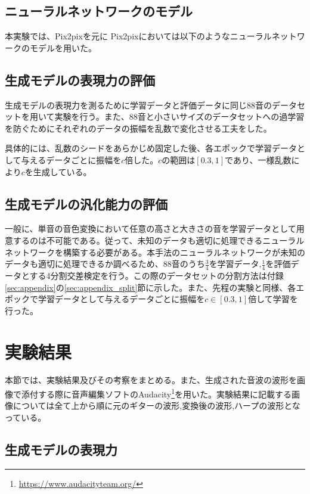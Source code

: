 \subsection{ニューラルネットワークのモデル}

本実験では、Pix2pixを元に
Pix2pixにおいては以下のようなニューラルネットワークのモデルを用いた。



\subsection{生成モデルの表現力の評価}

生成モデルの表現力を測るために学習データと評価データに同じ88音のデータセットを用いて実験を行う。また、88音と小さいサイズのデータセットへの過学習を防ぐためにそれぞれのデータの振幅を乱数で変化させる工夫をした。

具体的には、乱数のシードをあらかじめ固定した後、各エポックで学習データとして与えるデータごとに振幅を$c$倍した。$c$の範囲は$[0.3,1]$であり、一様乱数により$c$を生成している。

\subsection{生成モデルの汎化能力の評価}

一般に、単音の音色変換において任意の高さと大きさの音を学習データとして用意するのは不可能である。従って、未知のデータも適切に処理できるニューラルネットワークを構築する必要がある。本手法のニューラルネットワークが未知のデータも適切に処理できるか調べるため、88音のうち$\frac{3}{4}$を学習データ,$\frac{1}{4}$を評価データとする4分割交差検定を行う。この際のデータセットの分割方法は付録\ref{sec:appendix}の\ref{sec:appendix_split}節に示した。また、先程の実験と同様、各エポックで学習データとして与えるデータごとに振幅を$c \in [0.3,1]$倍して学習を行った。

\section{実験結果}

本節では、実験結果及びその考察をまとめる。また、生成された音波の波形を画像で添付する際に音声編集ソフトのAudacity\footnote{\url{https://www.audacityteam.org/}}を用いた。実験結果に記載する画像については全て上から順に元のギターの波形,変換後の波形,ハープの波形となっている。

\subsection{生成モデルの表現力}

